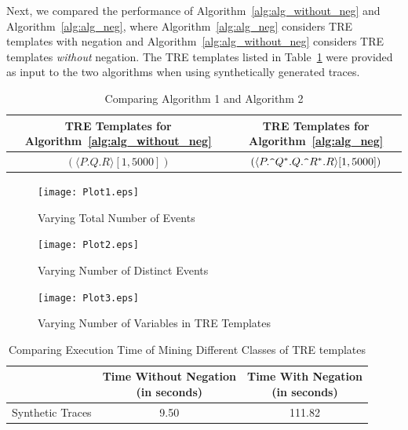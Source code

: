 \documentclass[]{sigplanconf}
\begin{document}
Next, we compared the performance of Algorithm~\ref{alg:alg_without_neg} and Algorithm~\ref{alg:alg_neg}, where Algorithm~\ref{alg:alg_neg} considers TRE templates with negation and Algorithm~\ref{alg:alg_without_neg} considers TRE templates \emph{without} negation. The TRE templates listed in Table~\ref{TREs_Syn_Comp} were provided as input to the two algorithms when using synthetically generated traces.

\begin{table}[ht]
	\centering
	\begin{adjustbox}{max width=\columnwidth}
		\begin{tabular}{|c|c|}
			\hline
			\textbf{TRE Templates for Algorithm~\ref{alg:alg_without_neg}} & \textbf{TRE Templates for Algorithm~\ref{alg:alg_neg}} \\
			\hline
			 $(\langle P.Q.R \rangle [1, 5000])$& $(\langle P.\verb!^!Q^*.Q.\verb!^!R^*.R \rangle [1, 5000])$  \\
			 \hline
		\end{tabular}
	\end{adjustbox}
	\caption{Comparing Algorithm 1 and Algorithm 2}
	\label{TREs_Syn_Comp}
\end{table}

\begin{figure}[ht]
  \centering
  \texttt{[image: Plot1.eps]}
  \caption{Varying Total Number of Events}	
  \label{fig:plot1}
\end{figure}

\begin{figure}[ht]
  \centering
  \texttt{[image: Plot2.eps]}
  \caption{Varying Number of Distinct Events}	
  \label{fig:plot2}
\end{figure}

\begin{figure}[ht]
  \centering
  \texttt{[image: Plot3.eps]}
  \caption{Varying Number of Variables in TRE Templates}
  \label{fig:plot3}
\end{figure}

\begin{table}[ht]
	\centering
	\begin{adjustbox}{max width=\columnwidth}
		\begin{tabular}{|c|c|c|}
			\hline
			  & \textbf{Time Without Negation \newline (in seconds)} & \textbf{Time With Negation \newline (in seconds)} \\
			\hline
			 Synthetic Traces & 9.50 & 111.82 \\
			 \hline
		\end{tabular}
	\end{adjustbox}
	\caption{Comparing Execution Time of Mining Different Classes of TRE templates}
	\label{table:syn_timing}
\end{table}
\end{document}

